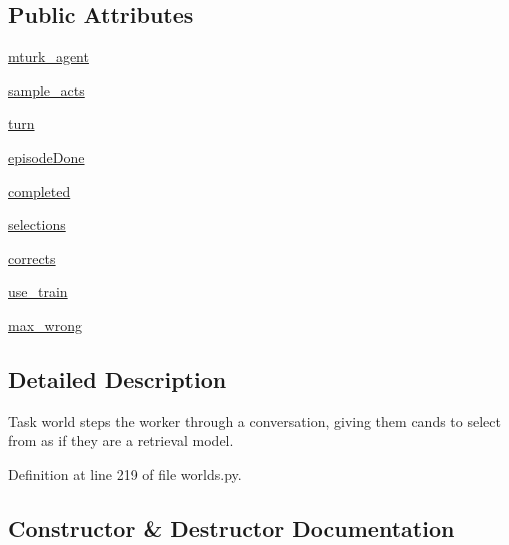 \subsection*{Public Attributes}
\begin{DoxyCompactItemize}
\item 
\hyperlink{classlight__chat__eval_1_1worlds_1_1LightEvalTaskWorld_ac8f15206b335ec5ea3498a3ee1b0f65f}{mturk\+\_\+agent}
\item 
\hyperlink{classlight__chat__eval_1_1worlds_1_1LightEvalTaskWorld_a60c0b70ca0cfb7d35c2b0eac85df0cf1}{sample\+\_\+acts}
\item 
\hyperlink{classlight__chat__eval_1_1worlds_1_1LightEvalTaskWorld_a54478e731c75aaf71048894bb762a005}{turn}
\item 
\hyperlink{classlight__chat__eval_1_1worlds_1_1LightEvalTaskWorld_ab0ffce12733c1c46f5dc64b1a802f1e2}{episode\+Done}
\item 
\hyperlink{classlight__chat__eval_1_1worlds_1_1LightEvalTaskWorld_a1deec2abb5e96799ec49097721586013}{completed}
\item 
\hyperlink{classlight__chat__eval_1_1worlds_1_1LightEvalTaskWorld_a9dac942996f55099107ba813e91ce437}{selections}
\item 
\hyperlink{classlight__chat__eval_1_1worlds_1_1LightEvalTaskWorld_a89359a6fdc961c97b5859980b3790540}{corrects}
\item 
\hyperlink{classlight__chat__eval_1_1worlds_1_1LightEvalTaskWorld_ad605071600d13b139e24541051eb4afb}{use\+\_\+train}
\item 
\hyperlink{classlight__chat__eval_1_1worlds_1_1LightEvalTaskWorld_a272355df766ac2722a7547deb5755651}{max\+\_\+wrong}
\end{DoxyCompactItemize}


\subsection{Detailed Description}
\begin{DoxyVerb}Task world steps the worker through a conversation, giving them cands
to select from as if they are a retrieval model.
\end{DoxyVerb}
 

Definition at line 219 of file worlds.\+py.



\subsection{Constructor \& Destructor Documentation}
\mbox{\label{classlight__chat__eval_1_1worlds_1_1LightEvalTaskWorld_a9f9e7de884af532dc436e72c8c0011fc}} 
